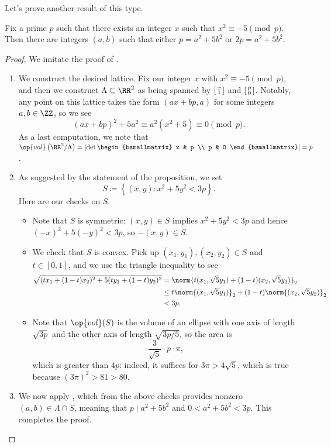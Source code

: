 \documentclass[../notes.tex]{subfiles}
\begin{document}
Let's prove another result of this type.
\begin{proposition} \label{prop:primes-of-form-5}
	Fix a prime $p$ such that there exists an integer $x$ such that $x^2\equiv-5\pmod p$. Then there are integers $(a,b)$ such that either $p=a^2+5b^2$ or $2p=a^2+5b^2$.
\end{proposition}
\begin{proof}
	We imitate the proof of .
	\begin{enumerate}
		\item We construct the desired lattice. Fix our integer $x$ with $x^2\equiv-5\pmod p$, and then we construct $\Lambda\subseteq\RR^2$ as being spanned by $\begin{bsmallmatrix}
			x \\ 1
		\end{bsmallmatrix}$ and $\begin{bsmallmatrix}
			p \\ 0
		\end{bsmallmatrix}$. Notably, any point on this lattice takes the form $(ax+bp,a)$ for some integers $a,b\in\ZZ$, so we see
		\[(ax+bp)^2+5a^2\equiv a^2\left(x^2+5\right)\equiv0\pmod p.\]
		As a last computation, we note that $\op{vol}\left(\RR^2/\Lambda\right)=\left|\det\begin{bsmallmatrix}
			x & p \\
			p & 0
		\end{bsmallmatrix}\right|=p$.
		\item As suggested by the statement of the proposition, we set
		\[S\coloneqq\left\{(x,y):x^2+5y^2<3p\right\}.\]
		Here are our checks on $S$.
		\begin{itemize}
			\item Note that $S$ is symmetric: $(x,y)\in S$ implies $x^2+5y^2<3p$ and hence $(-x)^2+5(-y)^2<3p$, so $-(x,y)\in S$.
			\item We check that $S$ is convex. Pick up $(x_1,y_1),(x_2,y_2)\in S$ and $t\in[0,1]$, and we use the triangle inequality to see
			\begin{align*}
				\sqrt{(tx_1+(1-t)x_2)^2+5(ty_1+(1-t)y_2)^2} &= \norm{t(x_1,\sqrt 5y_1)+(1-t)(x_2,\sqrt5y_2)}_2 \\
				&\le t\norm{(x_1,\sqrt5y_1)}_2+(1-t)\norm{(x_2,\sqrt5y_2)}_2 \\
				&< 3p.
			\end{align*}
			\item Note that $\op{vol}(S)$ is the volume of an ellipse with one axis of length $\sqrt{3p}$ and the other axis of length $\sqrt{3p/5}$, so the area is
			\[\frac3{\sqrt5}\cdot p\cdot\pi,\]
			which is greater than $4p$: indeed, it suffices for $3\pi>4\sqrt5$, which is true because $(3\pi)^2>81>80$.
		\end{itemize}
		\item We now apply , which from the above checks provides nonzero $(a,b)\in\Lambda\cap S$, meaning that $p\mid a^2+5b^2$ and $0<a^2+5b^2<3p$. This completes the proof.
		\qedhere
	\end{enumerate}
\end{proof}
\end{document}
